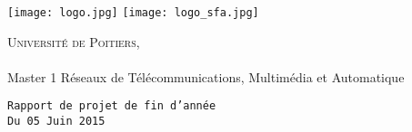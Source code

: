 


\begin{titlepage}
\begin{center}
\texttt{[image: logo.jpg]} %
\hfill%
\texttt{[image: logo\_sfa.jpg]}\\
\end{center}
\vspace*{1cm}



\begin{center}
\textsc{Universit\'e de Poitiers,}\paragraph{}
 Master 1 Réseaux de Télécommunications, Multimédia et Automatique
\end{center}


\begin{center}
\texttt{Rapport de projet de fin d'année\\
Du 05 Juin 2015} %
\end{center}
\vspace*{2cm}
 
 
\begin{center}
\setlength{\fboxsep}{2mm}
\setlength{\fboxrule}{2mm}
\end{center}




\end{titlepage}
